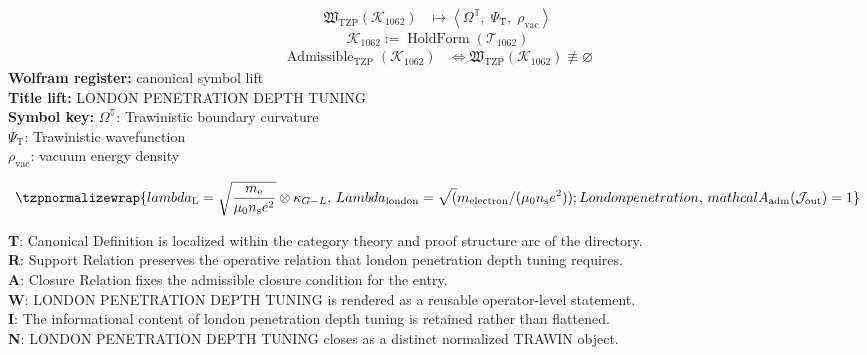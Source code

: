 \noindent
\begin{minipage}[t]{0.48\linewidth}
\begingroup
\small
\[
\begin{aligned}
\mathfrak{W}_{\mathrm{TZP}}\!\left(\mathcal{K}_{1062}\right)
&\longmapsto
\left\langle \Omega^{\mathbb{T}},\; \Psi_{\mathrm{T}},\; \rho_{\mathrm{vac}} \right\rangle
\end{aligned}
\]
\[
\mathcal{K}_{1062}
:=
\operatorname{HoldForm}\!\left(\mathcal{T}_{1062}\right)
\]
\[
\begin{aligned}
\operatorname{Admissible}_{\mathrm{TZP}}\!\left(\mathcal{K}_{1062}\right)
&\Longleftrightarrow
\mathfrak{W}_{\mathrm{TZP}}\!\left(\mathcal{K}_{1062}\right)\not\equiv\varnothing
\end{aligned}
\]
\textbf{Wolfram register:} canonical symbol lift\\
\textbf{Title lift:} LONDON PENETRATION DEPTH TUNING\\
\textbf{Symbol key:} \(\Omega^{\mathbb{T}}\): Trawinistic boundary curvature\\ \(\Psi_{\mathrm{T}}\): Trawinistic wavefunction\\ \(\rho_{\mathrm{vac}}\): vacuum energy density
\par
\endgroup
\end{minipage}\hfill
\begin{minipage}[t]{0.48\linewidth}
\[
\tzpnormalizewrap{lambda_{\mathrm{L}} = \sqrt{\frac{m_{\mathrm{e}}}{\mu_0 n_{\mathrm{s}} e^2}} \otimes \kappa_{G-L},\,Lambda_{\mathrm{london}} = \sqrt(m_{\mathrm{electron}}/(\mu_0 n_{\mathrm{s}} e^{2})); London penetration,\,mathcal{A}_{\mathrm{adm}}\!\left(\mathcal{J}_{\mathrm{out}}\right)=1}
\]

\small
\textbf{T}: Canonical Definition is localized within the category theory and proof structure arc of the directory.\\
\textbf{R}: Support Relation preserves the operative relation that london penetration depth tuning requires.\\
\textbf{A}: Closure Relation fixes the admissible closure condition for the entry.\\
\textbf{W}: LONDON PENETRATION DEPTH TUNING is rendered as a reusable operator-level statement.\\
\textbf{I}: The informational content of london penetration depth tuning is retained rather than flattened.\\
\textbf{N}: LONDON PENETRATION DEPTH TUNING closes as a distinct normalized TRAWIN object.
\normalsize
\end{minipage}

